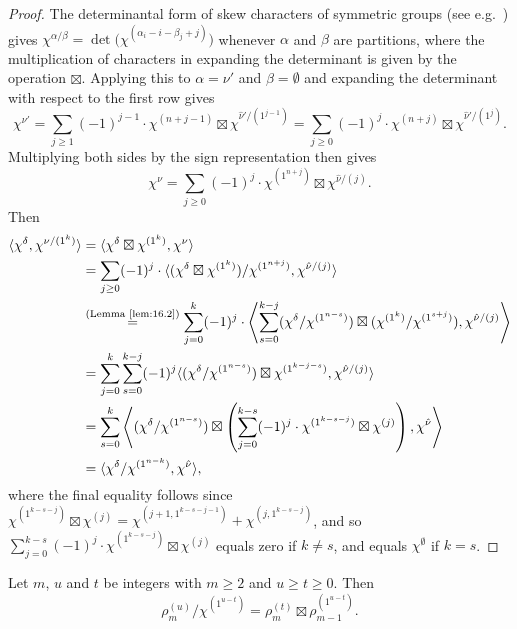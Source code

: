 \begin{proof}
	The determinantal form of skew characters of symmetric groups (see e.g.~\cite[2.3.13]{JK}) gives $\chi^{\alpha/\beta} = \det\big(\chi^{(\alpha_i-i-\beta_j+j)}\big)$ whenever $\alpha$ and $\beta$ are partitions, where the multiplication of characters in expanding the determinant is given by the operation $\boxtimes$. Applying this to $\alpha=\nu'$ and $\beta=\emptyset$ and expanding the determinant with respect to the first row gives
	\[ \chi^{\nu'} = \sum_{j\ge 1} (-1)^{j-1}\cdot \chi^{(n+j-1)}\boxtimes \chi^{\hat{\nu}'/(1^{j-1})} = \sum_{j\ge 0} (-1)^j\cdot\chi^{(n+j)}\boxtimes \chi^{\hat{\nu}'/(1^j)}. \]
	Multiplying both sides by the sign representation then gives
	\[ \chi^\nu = \sum_{j\ge 0} (-1)^j\cdot \chi^{(1^{n+j})}\boxtimes \chi^{\hat{\nu}/(j)}. \]
	Then
	\begin{align*}
		\langle\chi^\delta,\chi^{\nu/(1^k)}\rangle &= \langle \chi^\delta\boxtimes\chi^{(1^k)},\chi^\nu\rangle \\
		&= \sum_{j\ge 0}(-1)^j\cdot\langle(\chi^\delta\boxtimes\chi^{(1^k)})/\chi^{(1^{n+j})}, \chi^{\hat{\nu}/(j)} \rangle\\
		&\overset{\normalfont\tiny \text{(Lemma~\ref{lem:16.2})}}{=} \sum_{j=0}^k (-1)^j\cdot \left\langle \sum_{s=0}^{k-j}(\chi^\delta/\chi^{(1^{n-s})})\boxtimes(\chi^{(1^k)}/\chi^{(1^{s+j})}), \chi^{\hat{\nu}/(j)}\right\rangle\\
		&=\sum_{j=0}^k \sum_{s=0}^{k-j}(-1)^j \langle (\chi^\delta/\chi^{(1^{n-s})})\boxtimes \chi^{(1^{k-j-s})}, \chi^{\hat{\nu}/(j)}\rangle\\
		&= \sum_{s=0}^k \left\langle (\chi^\delta/\chi^{(1^{n-s})})\boxtimes \left(\sum_{j=0}^{k-s}(-1)^j\cdot\chi^{(1^{k-s-j})}\boxtimes\chi^{(j)}\right), \chi^{\hat{\nu}}\right\rangle\\
		&=\langle \chi^\delta/\chi^{(1^{n-k})}, \chi^{\hat{\nu}}\rangle,
	\end{align*}
	where the final equality follows since $\chi^{(1^{k-s-j})}\boxtimes\chi^{(j)}=\chi^{(j+1,1^{k-s-j-1})}+\chi^{(j,1^{k-s-j})}$, and so $\sum_{j=0}^{k-s}(-1)^j\cdot\chi^{(1^{k-s-j})}\boxtimes\chi^{(j)}$ equals zero if $k\ne s$, and equals $\chi^\emptyset$ if $k=s$.
\end{proof}

\begin{lemma}\label{lem:16.6}
	Let $m$, $u$ and $t$ be integers with $m\ge 2$ and $u\ge t\ge 0$. Then
	\[ \rho^{(u)}_m/\chi^{(1^{u-t})} = \rho^{(t)}_m\boxtimes \rho^{(1^{u-t})}_{m-1}. \]
\end{lemma}

